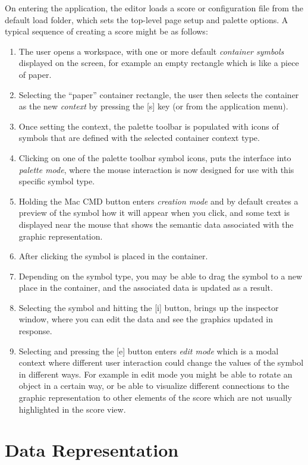 \documentclass{article}
\begin{document}
On entering the application, the editor loads a score or configuration file from the default load folder, which sets the top-level page setup and palette options. A typical sequence of creating a score might be as follows:
\begin{enumerate}\itemsep0pt
\item The user opens a workspace, with one or more default \textit{container symbols} displayed on the screen, for example an empty rectangle which is like a piece of paper.
\item Selecting the ``paper'' container rectangle, the user then selects the container as the new \textit{context} by pressing the [s] key (or from the application menu).
\item Once setting the context, the palette toolbar is populated with icons of symbols that are defined with the selected container context type.
\item Clicking on one of the palette toolbar symbol icons, puts the interface into \textit{palette mode}, where the mouse interaction is now designed for use with this specific symbol type.
\item Holding the Mac CMD button enters \textit{creation mode} and by default creates a preview of the symbol how it will appear when you click, and some text is displayed near the mouse that shows the semantic data associated with the graphic representation.
\item After clicking the symbol is placed in the container.
\item Depending on the symbol type, you may be able to drag the symbol to a new place in the container, and the associated data is updated as a result.
\item Selecting the symbol and hitting the [i] button, brings up the inspector window, where you can edit the data and see the graphics updated in response.
\item Selecting and pressing the [e] button enters \textit{edit mode} which is a modal context where different user interaction could change the values of the symbol in different ways. For example in edit mode you might be able to rotate an object in a certain way, or be able to visualize different connections to the graphic representation to other elements of the score which are not usually highlighted in the score view.
\end{enumerate}


\section{Data Representation}\label{sec:representation}
\end{document}
